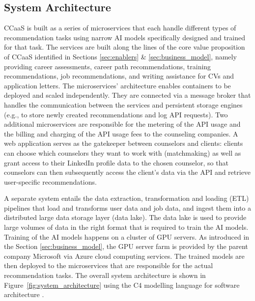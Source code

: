 \subsection{System Architecture}

CCaaS is built as a series of microservices that each handle different types of recommendation
tasks using narrow AI models specifically designed and trained for that task. The services are 
built along the lines of the core value proposition of CCaaS identified in Sections \ref{sec:enablers}
\& \ref{sec:business_model}, namely providing career assessments, career path recommendations, training
recommendations, job recommendations, and writing assistance for CVs and application letters. The
microservices' architecture enables containers to be deployed and scaled independently. They are
connected via a message broker that handles the communication between the services and persistent
storage engines (e.g., to store newly created recommendations and log API requests). Two additional
microservices are responsible for the metering of the API usage and the billing and charging of the
API usage fees to the counseling companies. A web application serves as the gatekeeper between
counselors and clients: clients can choose which counselors they want to work with (matchmaking)
as well as grant access to their LinkedIn profile data to the chosen counselor, so that counselors 
can then subsequently access the client's data via the API and retrieve user-specific recommendations.

A separate system entails the data extraction, transformation and loading (ETL) pipelines that load 
and transforms user data and job data, and ingest them into a distributed large data storage layer
(data lake). The data lake is used to provide large volumes of data in the right format that is 
required to train the AI models. Training of the AI models happens on a cluster of GPU servers. As
introduced in the Section \ref{sec:business_model}, the GPU server farm is provided by the parent
company Microsoft via Azure cloud computing services. The trained models are then deployed to the
microservices that are responsible for the actual recommendation tasks. The overall system architecture
is shown in Figure~\ref{fig:system_architecture} using the C4 modelling language for software architecture
\citep{brownC4ModelVisualising2010}.





